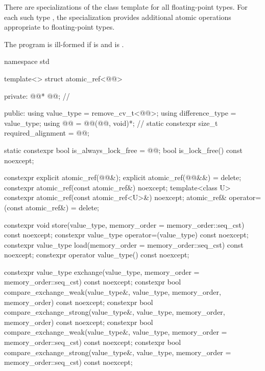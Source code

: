\pnum
{}%
There are specializations of the  class template
for all floating-point types.
For each such type ,
the specialization  provides
additional atomic operations appropriate to floating-point types.

\pnum
The program is ill-formed
if  is  and
 is .

\begin{codeblock}
namespace std {
  template<> struct atomic_ref<@@> {
  private:
    @@* @@;   // \expos

  public:
    using value_type = remove_cv_t<@@>;
    using difference_type = value_type;
    using @@ = @@(@@, void)*;       // \expos
    static constexpr size_t required_alignment = @@;

    static constexpr bool is_always_lock_free = @@;
    bool is_lock_free() const noexcept;

    constexpr explicit atomic_ref(@@&);
    explicit atomic_ref(@@&&) = delete;
    constexpr atomic_ref(const atomic_ref&) noexcept;
    template<class U>
      constexpr atomic_ref(const atomic_ref<U>&) noexcept;
    atomic_ref& operator=(const atomic_ref&) = delete;

    constexpr void store(value_type,
                         memory_order = memory_order::seq_cst) const noexcept;
    constexpr value_type operator=(value_type) const noexcept;
    constexpr value_type load(memory_order = memory_order::seq_cst) const noexcept;
    constexpr operator value_type() const noexcept;

    constexpr value_type exchange(value_type,
                                  memory_order = memory_order::seq_cst) const noexcept;
    constexpr bool compare_exchange_weak(value_type&, value_type,
                                         memory_order, memory_order) const noexcept;
    constexpr bool compare_exchange_strong(value_type&, value_type,
                                           memory_order, memory_order) const noexcept;
    constexpr bool compare_exchange_weak(value_type&, value_type,
                                         memory_order = memory_order::seq_cst) const noexcept;
    constexpr bool compare_exchange_strong(value_type&, value_type,
                                           memory_order = memory_order::seq_cst) const noexcept;

}}
\end{codeblock}
